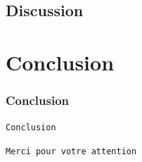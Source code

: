 \documentclass[11pt]{beamer}
\begin{document}
 \subsection{Discussion} 
 
 \section*{Conclusion}
 \begin{frame}
  \frametitle{Conclusion}
 	\begin{center}
 		\LARGE{\texttt{Conclusion}}
 	\end{center}
 \end{frame}
 
 \begin{frame}
 	\begin{center}
 		\LARGE{\texttt{Merci pour votre attention}}
 	\end{center}
 \end{frame}
 
% 
 
 
\end{document}
